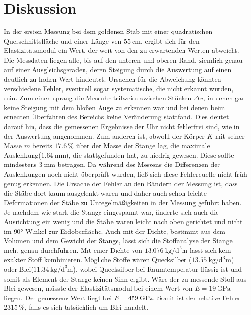 \section{Diskussion}
\label{sec:Diskussion}

In der ersten Messung bei dem goldenen Stab mit einer quadratischen Querschnittsfläche und einer Länge von $\SI{55}{\centi\meter}$, ergibt sich für den Elastizitätsmodul ein Wert, der weit von den zu erwartenden Werten abweicht. Die Messdaten liegen alle, bis auf den unteren und oberen Rand, ziemlich genau auf einer Ausgleichsgeraden, deren Steigung durch die Auswertung auf einen deutlich zu hohen Wert hindeutet. Ursachen für die Abweichung könnten verschiedene Fehler, eventuell sogar systematische, die nicht erkannt wurden, sein. Zum einen sprang die Messuhr teilweise zwischen Stücken $ \Delta x$, in denen gar keine Steigung mit dem bloßen Auge zu erkennen war und bei denen beim erneuten Überfahren des Bereichs keine Veränderung stattfand. Dies deutet darauf hin, dass die gemessenen Ergebnisse der Uhr nicht fehlerfrei sind, wie in der Auswertung angenommen. 
Zum anderen ist, obwohl der Körper $K$ mit seiner Masse $m$ bereits $\SI{17.6}{\percent}$ über der Masse der Stange lag, die maximale Auslenkung($\SI{1.64}{\milli\meter}$), die stattgefunden hat, zu niedrig gewesen. Diese sollte mindestens $\SI{3}{\milli\meter}$ betragen. Da während des Messens die Differenzen der Auslenkungen noch nicht überprüft wurden, ließ sich diese Fehlerquelle nicht früh genug erkennen. 
Die Ursache der Fehler an den Rändern der Messung ist, dass die Stäbe dort kaum ausgelenkt waren und daher auch schon leichte Deformationen der Stäbe zu Unregelmäßigkeiten in der Messung geführt haben. Je nachdem wie stark die Stange eingespannt war, änderte sich auch die Ausrichtung ein wenig und die Stäbe waren leicht nach oben gerichtet und nicht im 90° Winkel zur Erdoberfläche.  
Auch mit der Dichte, bestimmt aus dem Volumen und dem Gewicht der Stange, lässt sich die Stoffanalyse der Stange nicht genau durchführen. Mit einer Dichte von $\SI{13,076}{\kilo\gram\per\cubic\deci\meter}$ lässt sich kein exakter Stoff kombinieren. Mögliche Stoffe wären Quecksilber ($\SI{13,55}{\kilo\gram\per\cubic\deci\meter}$) oder Blei($\SI{11,34}{\kilo\gram\per\cubic\deci\meter}$), wobei Quecksilber bei Raumtemperatur flüssig ist und somit als Element der Stange keinen Sinn ergibt. Wäre der zu messende Stoff aus Blei gewesen, müsste der Elastizitätsmodul bei einem Wert von $E =\SI{19}{\giga\pascal}$ liegen. Der gemessene Wert liegt bei $E =\SI{459}{\giga\pascal}$. Somit ist der relative Fehler $\SI{2315}{\percent}$, falls es sich tatsächlich um Blei handelt. 


